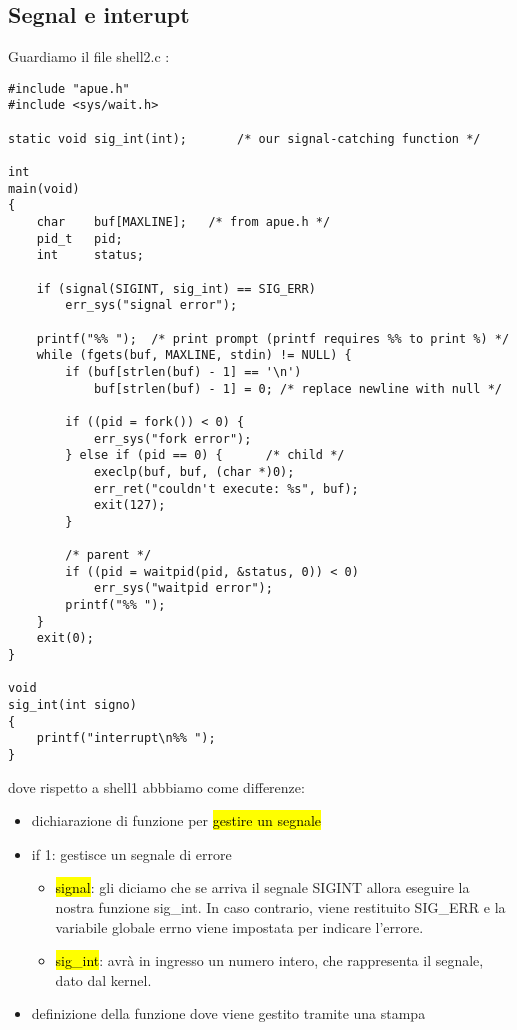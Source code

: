 \subsection{Segnal e interupt}

Guardiamo il file shell2.c :

\begin{lstlisting}
#include "apue.h"
#include <sys/wait.h>

static void	sig_int(int);		/* our signal-catching function */

int
main(void)
{
	char	buf[MAXLINE];	/* from apue.h */
	pid_t	pid;
	int		status;

	if (signal(SIGINT, sig_int) == SIG_ERR)
		err_sys("signal error");

	printf("%% ");	/* print prompt (printf requires %% to print %) */
	while (fgets(buf, MAXLINE, stdin) != NULL) {
		if (buf[strlen(buf) - 1] == '\n')
			buf[strlen(buf) - 1] = 0; /* replace newline with null */

		if ((pid = fork()) < 0) {
			err_sys("fork error");
		} else if (pid == 0) {		/* child */
			execlp(buf, buf, (char *)0);
			err_ret("couldn't execute: %s", buf);
			exit(127);
		}

		/* parent */
		if ((pid = waitpid(pid, &status, 0)) < 0)
			err_sys("waitpid error");
		printf("%% ");
	}
	exit(0);
}

void
sig_int(int signo)
{
	printf("interrupt\n%% ");
}
\end{lstlisting}

dove rispetto a shell1 abbbiamo come differenze:

\begin{itemize}
	\item dichiarazione di funzione per \hl{gestire un segnale}
	\item if 1: gestisce un segnale di errore
		
		\begin{itemize}
			\item \hl{signal}: gli diciamo che se arriva il segnale SIGINT allora eseguire la nostra funzione sig\_int. In caso contrario, viene restituito SIG\_ERR e la variabile globale errno viene impostata per indicare l'errore.
			\item \hl{sig\_int}: avrà in ingresso un numero intero, che rappresenta il segnale, dato dal kernel.
		\end{itemize}
		
	\item definizione della funzione dove viene gestito tramite una stampa
\end{itemize}

